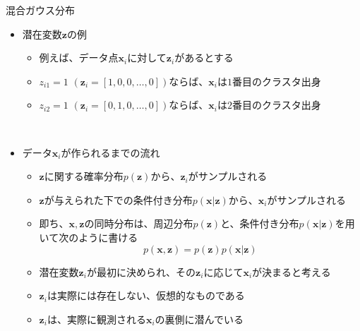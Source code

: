 \documentclass[dvipdfmx,notheorems,t]{beamer}
\begin{document}
\begin{frame}{混合ガウス分布}

\begin{itemize}
	\item 潜在変数$\bm{z}$の例
	\begin{itemize}
		\item 例えば、データ点$\bm{x}_i$に対して$\bm{z}_i$があるとする
		\item $z_{i1} = 1$ $(\bm{z}_i = \left[ 1, 0, 0, \ldots, 0 \right])$ならば、$\bm{x}_i$は$1$番目のクラスタ出身
		\item $z_{i2} = 1$ $(\bm{z}_i = \left[ 0, 1, 0, \ldots, 0 \right])$ならば、$\bm{x}_i$は$2$番目のクラスタ出身
	\end{itemize} \
	
	\item データ$\bm{x}_i$が作られるまでの流れ
	\begin{itemize}
		\item $\bm{z}$に関する確率分布$p(\bm{z})$から、$\bm{z}_i$がサンプルされる
		\item $\bm{z}$が与えられた下での条件付き分布$p(\bm{x} | \bm{z})$から、$\bm{x}_i$がサンプルされる
		\newline
		\item 即ち、$\bm{x}, \bm{z}$の同時分布は、周辺分布$p(\bm{z})$と、条件付き分布$p(\bm{x} | \bm{z})$を用いて次のように書ける
		\begin{equation}
			p(\bm{x}, \bm{z}) = p(\bm{z}) p(\bm{x} | \bm{z})
		\end{equation}
		
		\item 潜在変数$\bm{z}_i$が最初に決められ、その$\bm{z}_i$に応じて$\bm{x}_i$が決まると考える
		\item $\bm{z}_i$は実際には存在しない、仮想的なものである
		\newline
		\item $\bm{z}_i$は、実際に観測される$\bm{x}_i$の\alert{裏側に潜んでいる}
	\end{itemize}
\end{itemize}

\end{frame}
\end{document}
